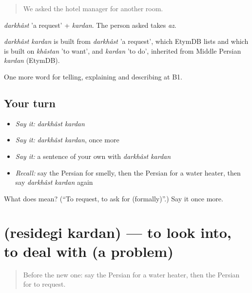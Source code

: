 \begin{quote}
We asked the hotel manager for another room.
\end{quote}

\emph{darkhâst} 'a request' + \emph{kardan}. The person asked takes \emph{az}.

\begin{cousinweb}
\emph{darkhâst kardan} is built from \emph{darkhâst} 'a request', which EtymDB lists and which is built on \emph{khâstan} 'to want', and \emph{kardan} 'to do', inherited from Middle Persian \emph{kardan} (EtymDB).
\end{cousinweb}

\begin{grammarlens}[title={What you've built}]
One more word for telling, explaining and describing at B1.
\end{grammarlens}

\subsection*{Your turn}
\begin{itemize}
\raggedright
  \item \emph{Say it:} \emph{darkhâst kardan}
  \item \emph{Say it:} \emph{darkhâst kardan}, once more
  \item \emph{Say it:} a sentence of your own with \emph{darkhâst kardan}
  \item \emph{Recall:} say the Persian for smelly, then the Persian for a water heater, then say \emph{darkhâst kardan} again
\end{itemize}

\begin{tcolorbox}[breakable,colback=teal!4,colframe=teal!35!black,title={Before you move on}]
What does   mean? (\textquotedblleft{}To request, to ask for (formally)\textquotedblright{}.) Say it once more.
\end{tcolorbox}
\section[\texorpdfstring{\fa{رسیدگی} \fa{کردن} (residegi kardan)}{رسیدگی کردن (residegi kardan)}]{  (residegi kardan) — to look into, to deal with (a problem)}

\label{lesson:FA-C441-residegi-kardan}



\begin{quote}
Before the new one: say the Persian for a water heater, then the Persian for to request.
\end{quote}

